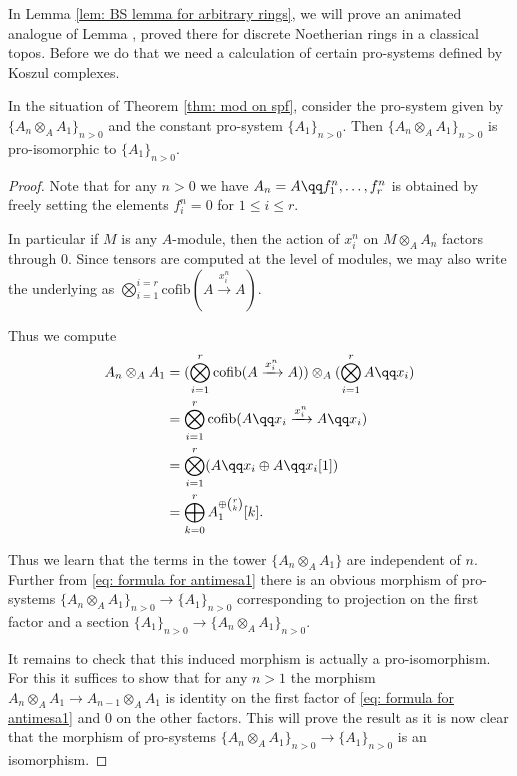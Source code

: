 \documentclass[10pt,reqno]{amsart}
\numberwithin{equation}{section}
\newcommand{\cofib}{\mathrm{cofib}}
\begin{document}
In Lemma \ref{lem: BS lemma for arbitrary rings}, we will prove an animated analogue of Lemma \cite[3.5.4]{BhattScholze2015ProEtale}, proved there for discrete Noetherian rings in a classical topos. 
Before we do that we need a calculation of certain pro-systems defined by Koszul complexes.


\begin{lemma}\label{lem: pro koszul}
    In the situation of Theorem \ref{thm: mod on spf}, consider the pro-system given by $\{A_{n}\otimes_A A_1\}_{n>0}$ and the constant pro-system $\{A_1\}_{n>0}$. Then $\{A_{n}\otimes_A A_1\}_{n>0}$ is pro-isomorphic to $\{A_1\}_{n>0}$.
\end{lemma}
\begin{proof}
Note that for any $n>0$ we have $A_n=A\qq f_1^n,\ldots, f^n_r$ is obtained by freely setting the elements $f^n_i=0$ for $ 1\leq i\leq r$. 


In particular if $M$ is any $A$-module, then the action of $x_i^n$ on $M\otimes_A A_n$ factors through $0.$
Since tensors are computed at the level of modules, we may also write the underlying as $\bigotimes_{i=1}^{i=r}\cofib(A\xrightarrow{x_i^n} A).$

Thus we compute 
\begin{align}\label{eq: formula for antimesa1}
A_n\otimes_A A_1
  &= (\bigotimes_{i=1}^{r}\cofib(A\xrightarrow{x_i^n} A))\otimes_A (\bigotimes_{i=1}^{r} A\qq x_i)\notag\\
  &= \bigotimes_{i=1}^{r}\cofib(A\qq x_i\xrightarrow{x_i^n} A\qq x_i)\notag\\
  &= \bigotimes_{i=1}^{r}(A\qq x_i\oplus A \qq x_i[1])\notag\\
  &= \bigoplus_{k=0}^{r} A_1^{\oplus \binom{r}{k} }[k].
\end{align}


Thus we learn that the terms in the tower $\{A_n\otimes_A A_1\}$ are independent of $n.$
Further from \ref{eq: formula for antimesa1} there is an obvious morphism of pro-systems $\{A_n\otimes_A A_1\}_{n>0}\to \{A_1\}_{n>0}$ corresponding to projection on the first factor and a section  $\{A_1\}_{n>0}\to \{A_n\otimes_A A_1\}_{n>0}.$ 

It remains to check that this induced morphism is actually a pro-isomorphism. For this it suffices to show that for any $n>1$ the morphism $A_n\otimes_A A_1\to A_{n-1}\otimes_A A_1$ is identity on the first factor of \ref{eq: formula for antimesa1} and $0$ on the other factors. This will prove the result as it is now clear that the morphism of pro-systems $\{A_n\otimes_A A_1\}_{n>0}\to \{A_1\}_{n>0}$ is an isomorphism. 


\end{proof}
\end{document}
